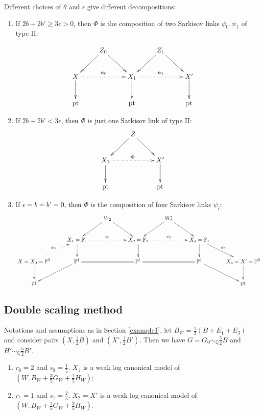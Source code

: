 Different choices of $\theta$ and  $\epsilon$ give different decompositions:
\begin{enumerate}
  \item\label{example1.1} If $ 2b+2b'\geqslant 3\epsilon>0 $, then $\Phi$ is the composition of two Sarkisov links $\psi_{0},\psi_{1}$ of type II:

  \[
    \xymatrix{
    &Z_{0}\ar[rd]\ar[ld] & &Z_{1}\ar[rd]\ar[ld]\\
    X\ar[d]\ar@{.>}[rr]^{\psi_{0}}& &X_{1}\ar@{.>}[rr]^{\psi_{1}}\ar[d]&&X'\ar[d]\\
    \text{pt}&&\text{pt}&&\text{pt}
    }
  \]
  \item If $ 2b+2b'< 3\epsilon $, then $\Phi$ is just one Sarkisov link  of type II:
        \[
          \xymatrix{
            &Z\ar[rd]\ar[ld] & \\
            X_{1}\ar@{.>}[rr]^{\Phi}\ar[d]& &X'\ar[d]\\
            \text{pt}&&\text{pt}
          }
        \]
  \item If $ \epsilon=b=b'=0 $, then $\Phi$ is the composition of four Sarkisov links $\psi_{i}$:
        \[ \xymatrix{
          &&W_2\ar[ld]\ar[rd]&&W_2'\ar[ld]\ar[rd]\\
          &X_1=\mathbb{F}_1\ar@{.>}[rr]^{\psi_{1}}\ar[d]&&X_2=\mathbb{F}_2\ar@{.>}[rr]^{\psi_{2}}\ar[d]&&X_3=\mathbb{F}_1\ar[d]\ar[rd]^{\psi_{3}}\\
          X=X_0=\mathbb{P}^2\ar[d]\ar@{.>}[ru]^{\psi_{0}}&\mathbb{P}^1\ar[ld]\ar@{=}[rr]&&\mathbb{P}^1\ar@{=}[rr]&&\mathbb{P}^1\ar[rd]&X_4=X'=\mathbb{P}^2\ar[d]\\
          \text{pt}&&&&&&\text{pt} } \]
\end{enumerate}

\subsection{Double scaling method}
Notations and assumptions as in Section \ref{example1}, let $B_{W}=\frac{1}{2}(B+E_{1}+E_{3})$ and consider pairs $(X,\frac{1}{2}B)$ and $(X',\frac{1}{2}B')$. Then we have $G=G_{0}\sim_{\mathbb{Q}}\frac{5}{2}B$ and $H'\sim_{\mathbb{Q}}\frac{5}{2}B'$.

\begin{enumerate}
  \item $r_{0}=2$ and $s_{0}=\frac{1}{5}$. $X_{1}$ is a weak log canonical model of $(W,B_{W}+\frac{3}{5}G_{W}+\frac{1}{5}H_{W})$;
  \item  $r_{1}=1$ and $s_{1}=\frac{2}{5}$. $X_{2}= X'$ is a weak log canonical model of $(W,B_{W}+\frac{1}{5}G_{W}+\frac{3}{5}H_{W})$.
\end{enumerate}

